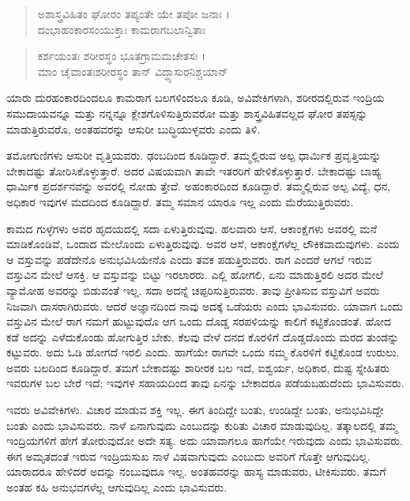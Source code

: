 \begin{verse}
ಅಶಾಸ್ತ್ರವಿಹಿತಂ ಘೋರಂ ತಪ್ಯಂತೇ ಯೇ ತಪೋ ಜನಾಃ ।\\ದಂಭಾಹಂಕಾರಸಂಯುಕ್ತಾಃ ಕಾಮರಾಗಬಲಾನ್ವಿತಾಃ 
\end{verse}

\begin{verse}
ಕರ್ಶಯಂತಃ ಶರೀರಸ್ಥಂ ಭೂತಗ್ರಾಮಮಚೇತಸಃ ।\\ಮಾಂ ಚೈವಾಂತಃಶರೀರಸ್ಥಂ ತಾನ್ ವಿದ್ಧ್ಯಾಸುರನಿಶ್ಚಯಾನ್ 
\end{verse}

{\small ಯಾರು ದುರಹಂಕಾರದಿಂದಲೂ ಕಾಮರಾಗ ಬಲಗಳಿಂದಲೂ ಕೂಡಿ, ಅವಿವೇಕಿಗಳಾಗಿ, ಶರೀರದಲ್ಲಿರುವ ಇಂದ್ರಿಯ ಸಮುದಾಯವನ್ನೂ ಮತ್ತು ನನ್ನನ್ನೂ ಕ್ಲೇಶಗೊಳಿಸುತ್ತಿರುವರೋ ಮತ್ತು ಶಾಸ್ತ್ರವಿಹಿತವಲ್ಲದ ಘೋರ ತಪಸ್ಸನ್ನು ಮಾಡುತ್ತಿರುವರೊ, ಅಂತಹವರನ್ನು ಆಸುರೀ ಬುದ್ಧಿಯುಳ್ಳವರು ಎಂದು ತಿಳಿ.}

ತಮೋಗುಣಿಗಳು ಆಸುರೀ ವೃತ್ತಿಯವರು. ಢಂಬದಿಂದ ಕೂಡಿದ್ದಾರೆ. ತಮ್ಮಲ್ಲಿರುವ ಅಲ್ಪ ಧಾರ್ಮಿಕ ಪ್ರವೃತ್ತಿಯನ್ನು ಬೇಕಾದಷ್ಟು ತೋರಿಸಿಕೊಳ್ಳುತ್ತಾರೆ. ಅದರ ವಿಷಯವಾಗಿ ತಾವೇ ಇತರರಿಗೆ ಹೇಳಿಕೊಳ್ಳುತ್ತಾರೆ. ಬೇಕಾದಷ್ಟು ಬಾಹ್ಯ ಧಾರ್ಮಿಕ ಪ್ರದರ್ಶನವನ್ನು ಅವರಲ್ಲಿ ನೋಡು ತ್ತೇವೆ. ಅಹಂಕಾರದಿಂದ ಕೂಡಿದ್ದಾರೆ. ತಮ್ಮಲ್ಲಿರುವ ಅಲ್ಪ ವಿದ್ಯೆ, ಧನ, ಅಧಿಕಾರ ಇವುಗಳ ಮದದಿಂದ ಕೂಡಿದ್ದಾರೆ. ತಮ್ಮ ಸಮಾನ ಯಾರೂ ಇಲ್ಲ ಎಂದು ಮೆರೆಯುತ್ತಿರುವರು.

ಕಾಮದ ಗುಳ್ಳೆಗಳು ಅವರ ಹೃದಯದಲ್ಲಿ ಸದಾ ಏಳುತ್ತಿರುವುವು. ಹಲವಾರು ಆಸೆ, ಆಕಾಂಕ್ಷೆಗಳು ಅವರಲ್ಲಿ ಮನೆ ಮಾಡಿಕೊಂಡಿವೆ, ಒಂದಾದ ಮೇಲೊಂದು ಏಳುತ್ತಿರುವುವು. ಅವರ ಆಸೆ, ಆಕಾಂಕ್ಷೆಗಳೆಲ್ಲ ಲೌಕಿಕವಾದುವುಗಳು. ಎಂದು ಆ ವಸ್ತುವನ್ನು ಪಡೆದೇನೊ ಅನುಭವಿಸಿಯೇನೊ ಎಂದು ತವಕ ಪಡುತ್ತಿರುವರು. ರಾಗ ಎಂದರೆ ಆಗಲೆ ಇರುವ ವಸ್ತುವಿನ ಮೇಲೆ ಆಸಕ್ತಿ. ಆ ವಸ್ತುವನ್ನು ಬಿಟ್ಟು ಇರಲಾರರು. ಎಲ್ಲಿ ಹೋಗಲಿ, ಏನು ಮಾಡುತ್ತಿರಲಿ ಅದರ ಮೇಲೆ ವ್ಯಾಮೋಹ ಅವರನ್ನು ಬಿಡುವಂತೆ ಇಲ್ಲ. ಸದಾ ಅದನ್ನೆ ಚಪ್ಪರಿಸುತ್ತಿರುವರು. ತಾವು ಪ್ರೀತಿಸುವ ವಸ್ತುವಿಗೆ ಅವರು ನಿಜವಾಗಿ ದಾಸರಾಗಿರುವರು. ಆದರೆ ಅಜ್ಞಾನದಿಂದ ನಾವು ಅದಕ್ಕೆ ಒಡೆಯರು ಎಂದು ಭಾವಿಸುವರು. ಯಾವಾಗ ಒಂದು ವಸ್ತುವಿನ ಮೇಲೆ ರಾಗ ನಮಗೆ ಹುಟ್ಟುವುದೊ ಆಗ ಒಂದು ದೊಡ್ಡ ಸರಪಳಿಯನ್ನು ಕಾಲಿಗೆ ಕಟ್ಟಿಕೊಂಡಂತೆ. ಹೋದ ಕಡೆ ಅದನ್ನು ಎಳೆದುಕೊಂಡು ಹೋಗುತ್ತಿರ ಬೇಕು. ಕೆಲವು ವೇಳೆ ದನದ ಕೊರಳಿಗೆ ದೊಡ್ಡದೊಂದು ಮರದ ತುಂಡನ್ನು ಕಟ್ಟುವರು. ಅದು ಓಡಿ ಹೋಗದೆ ಇರಲಿ ಎಂದು. ಹಾಗೆಯೇ ರಾಗವೇ ಒಂದು ನಮ್ಮ ಕೊರಳಿಗೆ ಕಟ್ಟಿಕೊಂಡ ಉರುಲು. ಅವರು ಬಲದಿಂದ ಕೂಡಿದ್ದಾರೆ. ತಮಗೆ ಬೇಕಾದಷ್ಟು ಶಾರೀರಕ ಬಲ ಇದೆ, ಐಶ್ವರ್ಯ, ಅಧಿಕಾರ, ದುಷ್ಟ ಸ್ನೇಹಿತರು ಇವರುಗಳ ಬಲ ಬೇರೆ ಇದೆ; ಇವುಗಳ ಸಹಾಯದಿಂದ ತಾವು ಏನನ್ನು ಬೇಕಾದರೂ ಪಡೆಯಬಹುದೆಂದು ಭಾವಿಸುವರು.

ಇವರು ಅವಿವೇಕಿಗಳು. ವಿಚಾರ ಮಾಡುವ ಶಕ್ತಿ ಇಲ್ಲ. ಈಗ ತಿಂದಿದ್ದೇ ಬಂತು, ಉಂಡಿದ್ದೇ ಬಂತು, ಅನುಭವಿಸಿದ್ದೇ ಬಂತು ಎಂದು ಭಾವಿಸುವರು. ನಾಳೆ ಏನಾಗುವುದು ಎಂಬುದನ್ನು ಕುರಿತು ವಿಚಾರ ಮಾಡುವುದಿಲ್ಲ. ತತ್ಕಾಲದಲ್ಲಿ ತಮ್ಮ ಇಂದ್ರಿಯಗಳಿಗೆ ಹೇಗೆ ತೋರುವುದೋ ಅದೇ ಸತ್ಯ. ಅದು ಯಾವಾಗಲೂ ಹಾಗೆಯೇ ಇರುವುದು ಎಂದು ಭಾವಿಸುವರು. ಈಗ ಅಮೃತದಂತೆ ಇರುವ ಇಂದ್ರಿಯಸುಖ ನಾಳೆ ವಿಷವಾಗುವುದು ಎಂಬುದು ಅವರಿಗೆ ಗೊತ್ತೇ ಆಗುವುದಿಲ್ಲ. ಯಾರಾದರೂ ಹೇಳಿದರೆ ಅದನ್ನು ನಂಬುವುದೂ ಇಲ್ಲ. ಅಂತಹವರನ್ನು ಹಾಸ್ಯ ಮಾಡುವರು, ಟೀಕಿಸುವರು. ತಮಗೆ ಅಂತಹ ಕಹಿ ಅನುಭವಗಳೆಲ್ಲ ಆಗುವುದಿಲ್ಲ ಎಂದು ಭಾವಿಸುವರು.

